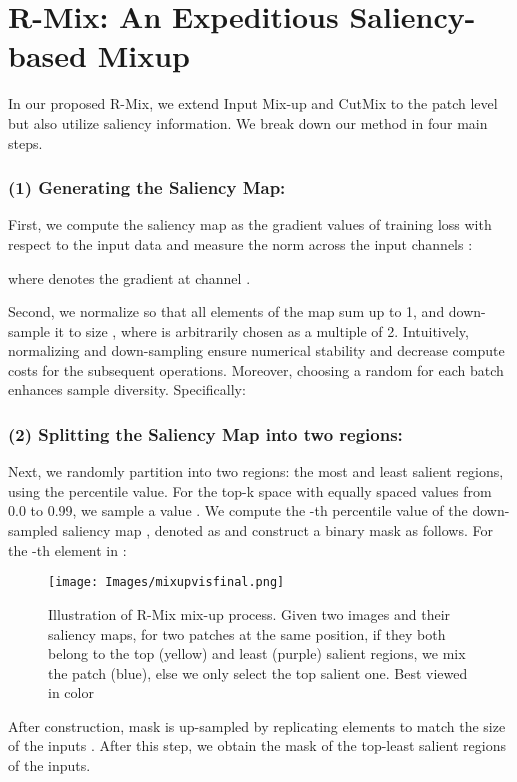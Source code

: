 \documentclass[letterpaper]{article} \usepackage[submission]{aaai23}  \usepackage{times}  \usepackage{helvet}  \usepackage{courier}  \usepackage[hyphens]{url}  \usepackage{graphicx} \urlstyle{rm} \def\UrlFont{\rm}  \usepackage{natbib}  \usepackage{caption} \frenchspacing  \setlength{\pdfpagewidth}{8.5in} \setlength{\pdfpageheight}{11in}
\newcommand{\mixup}{Input Mix-up}
\newcommand{\cutmix}{{CutMix}}
\newcommand{\rrlmix}{{R-Mix}}
\begin{document}
\section{R-Mix: An Expeditious Saliency-based Mixup}
\label{sec:method}
In our proposed \rrlmix{}, we extend \mixup{} and \cutmix{} to the patch level but also utilize saliency information. We break down our method in four main steps.

\subsubsection{(1) Generating the Saliency Map:} First, we compute the saliency map  as the gradient values of training loss with respect to the input data and measure the  norm across the input channels \cite{simonyan2014sal}:

where  denotes the gradient at channel . 


Second, we normalize  so that all elements of the map sum up to 1, and down-sample it to size , where  is arbitrarily chosen as a multiple of 2. Intuitively, normalizing and down-sampling ensure numerical stability and decrease compute costs for the subsequent operations. Moreover, choosing a random  for each batch enhances sample diversity. Specifically:



\subsubsection{(2) Splitting the Saliency Map into two regions:} Next, we randomly partition  into two regions: the most and least salient regions, using the percentile value. For the top-k space  with  equally spaced values from 0.0 to 0.99, we sample a value . We compute the -th percentile value of the down-sampled saliency map , denoted as  and construct a binary mask  as follows. For the -th element in :



\begin{figure}[t]
  \centering
  \texttt{[image: Images/mixupvisfinal.png]}
  \caption{Illustration of R-Mix mix-up process. Given two images  and their saliency maps, for two patches at the same position, if they both belong to the top (yellow) and least (purple) salient regions, we mix the patch (blue), else we only select the top salient one. Best viewed in color}
  \label{fig:mixup}
\end{figure}

After construction, mask  is up-sampled by replicating elements to match the size of the inputs . After this step, we obtain the mask of the top-least salient regions of the inputs.
\end{document}
